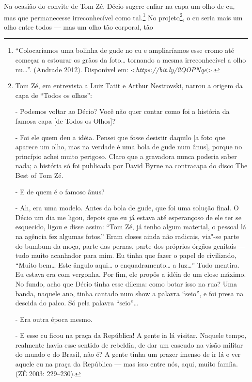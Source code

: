 Na ocasião do convite de Tom Zé, Décio sugere enfiar na capa um olho de
cu, mas que permanecesse irreconhecível como
tal.\footnote{``Colocaríamos uma bolinha de gude no
  cu e ampliaríamos esse cromo até começar a estourar os grãos da
  foto\ldots{} tornando a mesma irreconhecível a olho nu\ldots{}''.
  (Andrade 2012). Disponível em:
  \textless{}\emph{https://bit.ly/2QOPNqe}\textgreater{}.}
No projeto\footnote{Tom Zé, em entrevista a Luiz Tatit
  e Arthur Nestrovski, narrou a origem da capa de ``Todos os olhos'':

   - Podemos voltar ao Décio? Você não quer contar como foi
  a história da famosa capa {[}de Todos os Olhos{]}?

   - Foi ele quem deu a idéia. Pensei que fosse desistir daquilo {[}a
  foto que aparece um olho, mas na verdade é uma bola de gude num
  ânus{]}, porque no princípio achei muito perigoso. Claro que a
  gravadora nunca poderia saber nada; a história só foi publicada por
  David Byrne na contracapa do disco The Best of Tom Zé.

   - E de quem é o famoso ânus?

   - Ah, era uma modelo. Antes da bola de gude, que foi uma solução
  final. O Décio um dia me ligou, depois que eu já estava até
  esperançoso de ele ter se esquecido, ligou e disse assim: ``Tom Zé, já
  tenho algum material, o pessoal lá na agência fez algumas fotos.''
  Eram closes ainda não radicais, via"-se parte do bumbum da moça,
  parte das pernas, parte dos próprios órgãos genitais --- tudo muito
  acanhador para mim. Eu tinha que fazer o papel de civilizado, ``Muito
  bem\ldots{} Este ângulo aqui\ldots{} o enquadramento\ldots{} a luz\ldots{}'' Tudo mentira.
  Eu estava era com vergonha. Por fim, ele propôs a idéia de um close
  máximo. No fundo, acho que Décio tinha esse dilema: como botar isso na
  rua? Uma banda, naquele ano, tinha cantado num show a palavra
  ``seio'', e foi presa na descida do palco. Só pela palavra ``seio''\ldots{}

   - Era outra época mesmo.

   - E esse cu ficou na praça da República! A gente ia lá visitar.
  Naquele tempo, realmente havia esse sentido de rebeldia, de dar um
  cascudo na visão militar do mundo e do Brasil, não é? A gente tinha um
  prazer imenso de ir lá e ver aquele cu na praça da República --- mas
  isso entre nós, aqui, muito famíia. (ZÉ 2003: 229--230).}, o cu
seria mais um olho entre todos --- mas um olho tão corporal, tão
